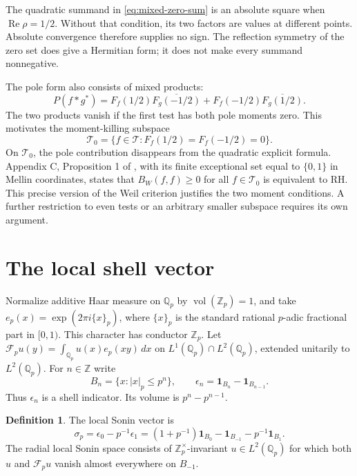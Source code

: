 \documentclass[11pt,letterpaper]{article}
\theoremstyle{definition}
\newtheorem{definition}[theorem]{Definition}
\theoremstyle{remark}
\newcommand{\Q}{\mathbb Q}
\newcommand{\Z}{\mathbb Z}
\newcommand{\T}{\mathcal T}
\newcommand{\Rea}{\operatorname{Re}}
\newcommand{\ind}{\mathbf1}
\begin{document}
The quadratic summand in \eqref{eq:mixed-zero-sum} is an absolute square
when $\Rea\rho=1/2$. Without that condition, its two factors are values
at different points. Absolute convergence therefore supplies no sign.
The reflection symmetry of the zero set does give a Hermitian form;
it does not make every summand nonnegative.

The pole form also consists of mixed products:
\begin{equation}\label{eq:pole-mixed}
 P(f*g^*)=F_f(1/2)\overline{F_g(-1/2)}
          +F_f(-1/2)\overline{F_g(1/2)}.
\end{equation}
The two products vanish if the first test has both pole moments zero.
This motivates the moment-killing subspace
\begin{equation}\label{eq:primitive-tests}
 \T_0=\{f\in\T:F_f(1/2)=F_f(-1/2)=0\}.
\end{equation}
On $\T_0$, the pole contribution disappears from the quadratic
explicit formula. Appendix C, Proposition 1 of \cite{CC2020},
with its finite exceptional set equal to $\{0,1\}$ in Mellin
coordinates, states that $B_W(f,f)\ge0$ for all $f\in\T_0$
is equivalent to RH. This precise version of the Weil criterion
justifies the two moment conditions. A further restriction to
even tests or an arbitrary smaller subspace requires its own
argument.

\section{The local shell vector}

Normalize additive Haar measure on $\Q_p$ by
$\operatorname{vol}(\Z_p)=1$, and take
$e_p(x)=\exp(2\pi i\{x\}_p)$, where $\{x\}_p$ is the standard
rational $p$-adic fractional part in $[0,1)$. This character has
conductor $\Z_p$. Let $\mathscr F_pu(y)=\int_{\Q_p}u(x)e_p(xy)\,dx$
on $L^1(\Q_p)\cap L^2(\Q_p)$, extended unitarily to
$L^2(\Q_p)$. For $n\in\Z$ write
\begin{equation}\label{eq:balls-shells}
 B_n=\{x:|x|_p\le p^n\},\qquad
 \epsilon_n=\ind_{B_n}-\ind_{B_{n-1}}.
\end{equation}
Thus $\epsilon_n$ is a shell indicator. Its volume is
$p^n-p^{n-1}$.

\begin{definition}\label{def:local-correspondence:shell}
The local Sonin vector is
\begin{equation}\label{eq:sigma}
 \sigma_p=\epsilon_0-p^{-1}\epsilon_1
 =(1+p^{-1})\ind_{B_0}-\ind_{B_{-1}}-p^{-1}\ind_{B_1}.
\end{equation}
The radial local Sonin space consists of $\Z_p^\times$-invariant
$u\in L^2(\Q_p)$ for which both $u$ and $\mathscr F_pu$ vanish almost
everywhere on $B_{-1}$.
\end{definition}
\end{document}
